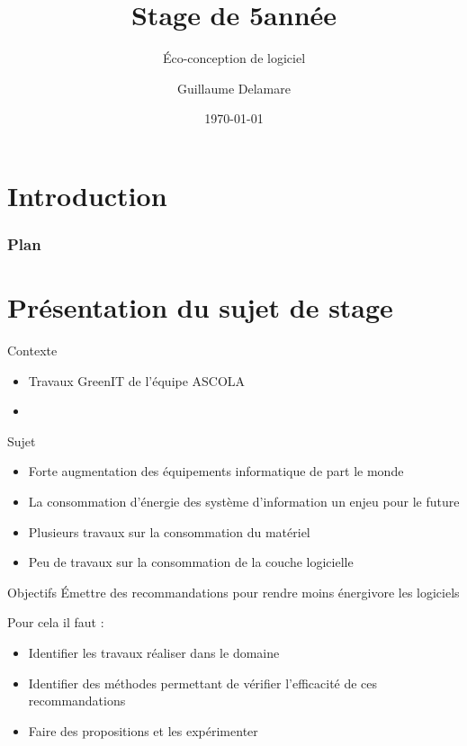 \documentclass{beamer}
\title{Stage de 5\ieme année}
\subtitle{Éco-conception de logiciel}
\author{Guillaume Delamare}
\institute{EMN - Équipe ASCOLA}
\date{\today}
\begin{document}
    \begin{frame}
	\titlepage
    \end{frame}

    \section*{Introduction}
	\begin{frame}
	    \frametitle{Plan}
	    \tableofcontents[hideallsubsections]{}
	\end{frame}
	
    \section{Présentation du sujet de stage}
	\begin{frame}{Contexte}
	    \begin{itemize}
		\item Travaux GreenIT de l'équipe ASCOLA
		\item
	    \end{itemize}
	\end{frame}
    	\begin{frame}{Sujet}
	    \begin{itemize}
		\item Forte augmentation des équipements informatique de part le monde
		\item La consommation d'énergie des système d'information un enjeu pour le future
		\item Plusieurs travaux sur la consommation du matériel
		\item Peu de travaux sur la consommation de la couche logicielle
	    \end{itemize}
	\end{frame}
	\begin{frame}{Objectifs}
	    Émettre des recommandations pour rendre moins énergivore les logiciels
	    \begin{block}{Pour cela il faut :}
	    \begin{itemize}
		\item Identifier les travaux réaliser dans le domaine
		\item Identifier des méthodes permettant de vérifier l'efficacité de ces recommandations
		\item Faire des propositions et les expérimenter
	    \end{itemize}
	    \end{block}
	\end{frame}
		
\end{document}
